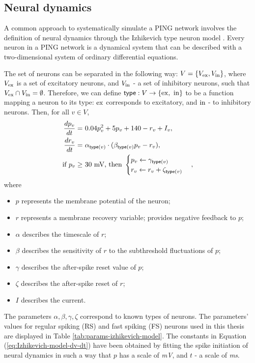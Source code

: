 \subsection{Neural dynamics}
\label{sec:neural-dynamics}

A common approach to systematically simulate a PING network involves the definition of neural dynamics through the Izhikevich type neuron model  \cite{Izhikevich2003}. Every neuron in a PING network is a dynamical system that can be described with a two-dimensional system of ordinary differential equations. 

The set of neurons can be separated in the following way: $V = \{ V_{\mathrm{ex}}, V_{\mathrm{in}}\}$, where $V_{\mathrm{ex}}$ is a set of excitatory neurons, and $V_{\mathrm{in}}$ - a set of inhibitory neurons, such that $V_{\mathrm{ex}} \cap V_{\mathrm{in}} = \emptyset$.
Therefore, we can define $\mathsf{type}: V \to \{ \mathrm{ex}, \ \mathrm{in} \}$ to be a function mapping a neuron to its type: $\mathrm{ex}$ corresponds to excitatory, and $\mathrm{in}$ - to inhibitory neurons. Then, for all $v \in V$,
\begin{align}
    \frac{dp_v}{dt} =\ & 0.04 p_v^2 + 5p_v + 140 - r_v + I_v,
    \label{eq:Izhikevich-model-dv-dt} \\
    \frac{dr_v}{dt} =\ & \alpha_{\mathsf{type}(v)} \cdot (\beta_{\mathsf{type}(v)} p_v - r_v), \label{eq:Izhikevich-model-dr-dt} \\
    \text{if } p_v \geq\ & 30 \text{ mV, then } 
    \begin{cases}
        p_v \leftarrow \gamma_{\mathsf{type}(v)} \\
        r_v \leftarrow r_v + \zeta_{\mathsf{type}(v)}
    \end{cases}, 
    \label{eq:Izhikevich-model-p30}
\end{align}
where
\begin{itemize}
    \item $p$ represents the membrane potential of the neuron; 
    
    \item $r$ represents a membrane recovery variable; provides negative feedback to $p$;
    
    \item $\alpha$ describes the timescale of $r$;
    
    \item $\beta$ describes the sensitivity of $r$ to the subthreshold fluctuations of $p$;
    
    \item $\gamma$ describes the after-spike reset value of $p$;
    
    \item $\zeta$ describes the after-spike reset of $r$;
    
    \item $I$ describes the current.
\end{itemize}
The parameters $\alpha, \beta, \gamma, \zeta$ correspond to known types of neurons. The parameters' values for regular spiking (RS) and fast spiking (FS) neurons used in this thesis are displayed in Table \ref{tab:params-izhikevich-model}. The constants in Equation (\ref{eq:Izhikevich-model-dv-dt}) have been obtained by fitting the spike initiation of neural dynamics in such a way that $p$ has a scale of \textit{mV}, and $t$ - a scale of \textit{ms}.

